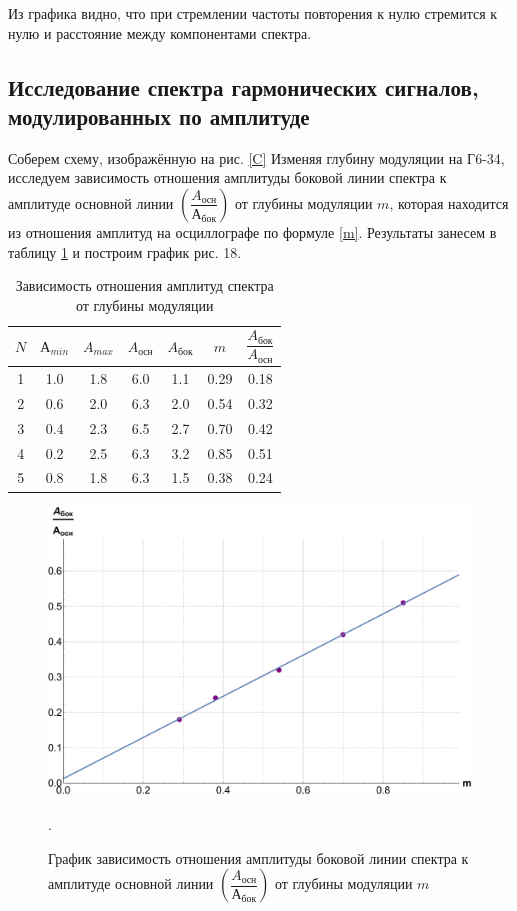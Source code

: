 \documentclass[12pt]{kiarticle}
\begin{document}
  Из графика видно, что при стремлении частоты повторения к нулю стремится к нулю и расстояние между компонентами спектра.  
  
  \subsection{Исследование спектра гармонических сигналов, модулированных по амплитуде}
  	
  	Соберем схему, изображённую на рис. \ref{C}
  	Изменяя глубину модуляции на Г6-34, исследуем зависимость
  	отношения амплитуды боковой линии спектра к амплитуде основной линии $ \left(  \dfrac{A_{осн}}{А_{бок}}  \right ) $ от глубины модуляции $ m $, которая находится из отношения амплитуд на осциллографе по формуле \eqref{m}. Результаты занесем в таблицу \ref{C_table} и построим график рис. 18. 
  	
  	
  	\begin{table}[h]
  		\caption{Зависимость отношения амплитуд спектра от глубины модуляции}
  		\begin{center}
  			\begin{tabular}{|c|c|c|c|c|c|c|}
  				\hline
  				$ N $  & $ А_{min} $ & $ A_{max} $ & $ A_{осн} $ & $ A_{бок} $ & $ m $ & $ \dfrac{A_{бок}}{A_{осн}} $\\
  				\hline
  			1 & 1.0 & 1.8 & 6.0 & 1.1 & 0.29 & 0.18 \\
  			2 & 0.6 & 2.0 & 6.3 & 2.0 & 0.54 & 0.32 \\
  			3 & 0.4 & 2.3 & 6.5 & 2.7 & 0.70 & 0.42 \\
  			4 & 0.2 & 2.5 & 6.3 & 3.2 & 0.85 & 0.51 \\
  			5 & 0.8 & 1.8 & 6.3 & 1.5 & 0.38 & 0.24 \\
  				\hline
  			\end{tabular}
  		\end{center}
  		\label{C_table}
  	\end{table}
  	
  	\begin{figure}[h!]
  		\label{C_g}
  		\includegraphics[scale=0.47]{C.pdf}
  		\caption{График зависимость отношения амплитуды боковой линии спектра к амплитуде основной линии $ \left(  \dfrac{A_{осн}}{А_{бок}}  \right ) $ от глубины модуляции $ m $}. 
  	\end{figure}
  	
\end{document}
